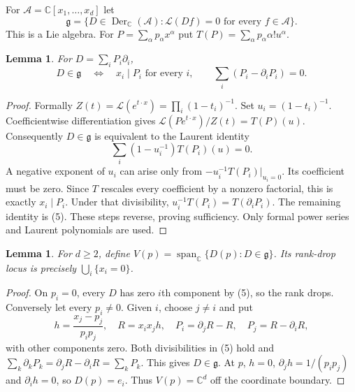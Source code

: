 \documentclass[11pt]{article}
\newtheorem{lemma}[proposition]{Lemma}
\newcommand{\Lfac}{\mathcal L}
\newcommand{\C}{\mathbb C}
\newcommand{\A}{\mathcal A}
\begin{document}
For $\A=\C[x_1,\ldots,x_d]$ let
\[
 \mathfrak g=\{D\in\operatorname{Der}_{\C}(\A):
                 \Lfac(Df)=0\text{ for every }f\in\A\}.
\]
This is a Lie algebra. For $P=\sum_\alpha p_\alpha x^\alpha$ put
$T(P)=\sum_\alpha p_\alpha\alpha!u^\alpha$.

\begin{lemma}\label{lem:derivations}
For $D=\sum_iP_i\partial_i$,
\[
 D\in\mathfrak g
 \quad\Longleftrightarrow\quad
 x_i\mid P_i\text{ for every }i,\qquad
 \sum_i(P_i-\partial_iP_i)=0.                            \tag{5}
\]
\end{lemma}
\begin{proof}
Formally
$Z(t)=\Lfac(e^{t\cdot x})=\prod_i(1-t_i)^{-1}$.
Set $u_i=(1-t_i)^{-1}$. Coefficientwise differentiation gives
$\Lfac(Pe^{t\cdot x})/Z(t)=T(P)(u)$.
Consequently $D\in\mathfrak g$ is equivalent to the Laurent identity
\[
 \sum_i(1-u_i^{-1})T(P_i)(u)=0.                          \tag{6}
\]
A negative exponent of $u_i$ can arise only from
$-u_i^{-1}T(P_i)|_{u_i=0}$. Its coefficient must be zero.
Since $T$ rescales every coefficient by a nonzero factorial,
this is exactly $x_i\mid P_i$. Under that divisibility,
$u_i^{-1}T(P_i)=T(\partial_iP_i)$.
The remaining identity is (5). These steps reverse, proving sufficiency.
Only formal power series and Laurent polynomials are used.
\end{proof}

\begin{lemma}\label{lem:boundary}
For $d\geq2$, define
$V(p)=\operatorname{span}_{\C}\{D(p):D\in\mathfrak g\}$.
Its rank-drop locus is precisely $\bigcup_i\{x_i=0\}$.
\end{lemma}
\begin{proof}
On $p_i=0$, every $D$ has zero $i$th component by (5), so the rank
drops. Conversely let every $p_i\ne0$. Given $i$, choose $j\ne i$ and put
\[
 h=\frac{x_j-p_j}{p_ip_j},\quad R=x_ix_jh,\quad
 P_i=\partial_jR-R,\quad P_j=R-\partial_iR,
\]
with other components zero.
Both divisibilities in (5) hold and
$\sum_k\partial_kP_k=\partial_jR-\partial_iR=\sum_kP_k$.
This gives $D\in\mathfrak g$. At $p$, $h=0$,
$\partial_jh=1/(p_ip_j)$ and $\partial_ih=0$, so $D(p)=e_i$.
Thus $V(p)=\C^d$ off the coordinate boundary.
\end{proof}
\end{document}
